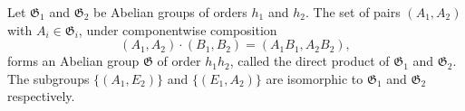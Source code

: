 Let $\mathfrak{G}_1$ and $\mathfrak{G}_2$ be Abelian groups of orders $h_1$ and $h_2$. The set of pairs $(A_1, A_2)$ with $A_i \in \mathfrak{G}_i$, under componentwise composition
$$(A_1, A_2) \cdot (B_1, B_2) = (A_1 B_1, A_2 B_2),$$
forms an Abelian group $\mathfrak{G}$ of order $h_1 h_2$, called the direct product of $\mathfrak{G}_1$ and $\mathfrak{G}_2$. The subgroups $\{(A_1, E_2)\}$ and $\{(E_1, A_2)\}$ are isomorphic to $\mathfrak{G}_1$ and $\mathfrak{G}_2$ respectively.
